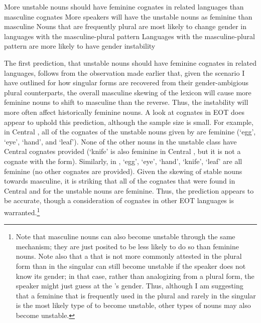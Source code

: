 \documentclass[output=paper,modfonts]{langscibook}
\begin{document}
\ea
\label{ex:paster:16}
\ea  More unstable nouns should have feminine cognates in related languages than masculine cognates
\ex  More speakers will have the unstable nouns as feminine than masculine
\ex  Nouns that are frequently plural are most likely to change gender in languages with the masculine-plural pattern
\ex  Languages with the masculine-plural pattern are more likely to have gender instability
\z
\z

The first prediction, that unstable nouns should have feminine cognates in related languages, follows from the observation made earlier that, given the scenario I have outlined for how singular forms are recovered from their gender-ambigious plural counterparts, the overall masculine skewing of the lexicon will cause more feminine nouns to shift to masculine than the reverse. Thus, the instability will more often affect historically feminine nouns. A look at cognates in EOT does appear to uphold this prediction, although the sample size is small. For example, in Central , all of the cognates of the unstable nouns given by \citet{Saeed1987} are feminine (‘egg’, ‘eye’, ‘hand’, and ‘leaf’). None of the other nouns in the unstable class have Central  cognates provided (‘knife’ is also feminine in Central , but it is not a cognate with the  form). Similarly, in  \citep{Tosco1997}, ‘egg’, ‘eye’, ‘hand’, ‘knife’, ‘leaf’ are all feminine (no other cognates are provided). Given the skewing of stable  nouns towards masculine, it is striking that all of the cognates that were found in Central  and  for the unstable nouns are feminine. Thus, the prediction appears to be accurate, though a consideration of cognates in other EOT languages is warranted.\footnote{Note that masculine nouns can also become unstable through the same mechanism; they are just posited to be less likely to do so than feminine nouns. Note also that a  that is not more commonly attested in the plural form than in the singular can still become unstable if the speaker does not know its gender; in that case, rather than analogizing from a plural form, the speaker might just guess at the ’s gender. Thus, although I am suggesting that a feminine  that is frequently used in the plural and rarely in the singular is the most likely type of  to become unstable, other types of nouns may also become unstable.}
\end{document}
